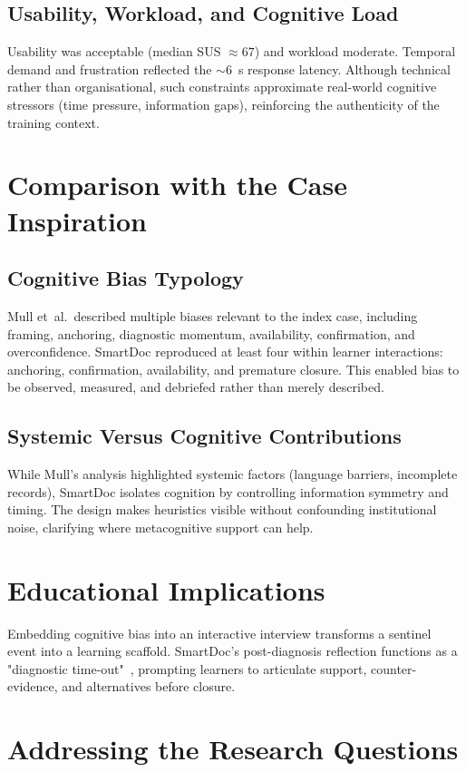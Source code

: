 \subsection{Usability, Workload, and Cognitive Load}
Usability was acceptable (median SUS \(\approx 67\)) and workload moderate. Temporal demand
and frustration reflected the \(\sim 6\)~s response latency. Although technical rather than
organisational, such constraints approximate real-world cognitive stressors (time pressure,
information gaps), reinforcing the authenticity of the training context.

\section{Comparison with the Case Inspiration}

\subsection{Cognitive Bias Typology}
Mull et~al.\ described multiple biases relevant to the index case, including framing,
anchoring, diagnostic momentum, availability, confirmation, and overconfidence.
SmartDoc reproduced at least four within learner interactions: anchoring, confirmation,
availability, and premature closure. This enabled bias to be observed, measured, and
debriefed rather than merely described.

\subsection{Systemic Versus Cognitive Contributions}
While Mull’s analysis highlighted systemic factors (language barriers, incomplete records),
SmartDoc isolates cognition by controlling information symmetry and timing. The design
makes heuristics visible without confounding institutional noise, clarifying where
metacognitive support can help.

\section{Educational Implications}
Embedding cognitive bias into an interactive interview transforms a sentinel event into a
learning scaffold. SmartDoc's post-diagnosis reflection functions as a "diagnostic
time-out"~\parencite{mull_cognitive_2015}, prompting learners to articulate support,
counter-evidence, and alternatives before closure.

\section{Addressing the Research Questions}
\label{sec:rq-addressed}

